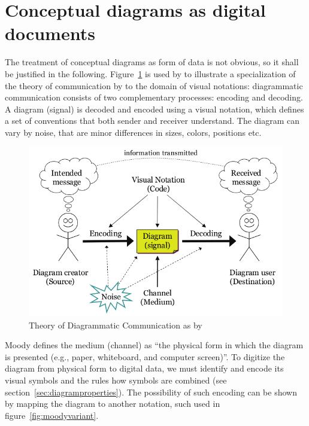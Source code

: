 \section{Conceptual diagrams as digital documents}
\label{appendixB}

The treatment of conceptual diagrams as form of data is not obvious, so it
shall be justified in the following. Figure~\ref{fig:moody2009fig6} is used by
\textcite{Moody2009} to illustrate a specialization of the theory of
communication by \textcite{Shannon1948} to the domain of visual notations:
diagrammatic communication consists of two complementary processes: encoding
and decoding. A diagram (signal) is decoded and encoded using a visual
notation, which defines a set of conventions that both sender and receiver
understand. The diagram can vary by noise, that are minor differences in sizes,
colors, positions etc.  \hspace{5mm}

\begin{figure}[b]
\centering
\includegraphics[width=0.7\linewidth]{img/moody2009fig6.png}
\caption{Theory of Diagrammatic Communication as by \textcite{Moody2009}}
\label{fig:moody2009fig6}
\end{figure}

Moody defines the medium (channel) as ``the physical form in which the diagram
is presented (e.g., paper, whiteboard, and computer screen)''. To digitize the
diagram from physical form to digital data, we must identify and encode its
visual symbols and the rules how symbols are combined (see
section~\ref{sec:diagramproperties}). The possibility of such encoding can be
shown by mapping the diagram to another notation, such used in
figure~\ref{fig:moodyvariant}.

